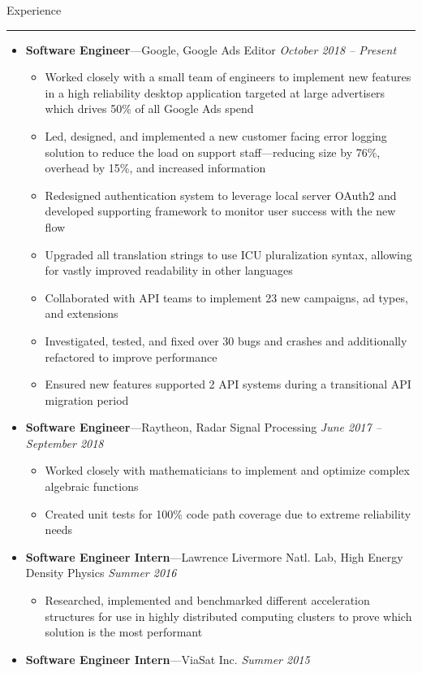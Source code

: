 \documentclass[10pt,oneside]{article}
\newcommand{\sectitle}[1]{
  \begin{flushleft}{\selectfont\Large#1}\end{flushleft}
}
\newenvironment{ressection}[1]{
  \vspace{0pt}
  \sectitle{#1}
  \vspace{-10pt}\rule{\textwidth}{0.5pt}
  \vspace{-10pt}
  \begin{itemize}[leftmargin=13pt]
  \vspace{-2pt}
}{
  \end{itemize}
}
\newcommand{\ressubitem}[1]{
  \vspace{-1pt}
  \item[--] \begin{flushleft} #1 \end{flushleft}
}
\newcommand{\resbigitemline}[3]{
  \vspace{-1pt}
  \item
  \textbf{#1}---#2
  \hfill
  \textit{#3}
}
\newenvironment{ressubsecline}[3]{
  \resbigitemline{#1}{#2}{#3}
  \vspace{-2pt}
  \begin{itemize}
}{
  \end{itemize}
  \vspace{-2pt}
}
\begin{document}
\begin{ressection}{Experience}
  \begin{ressubsecline}{Software Engineer}{Google, Google Ads Editor}{October 2018 -- Present}
    \ressubitem{Worked closely with a small team of engineers to implement new features in a high reliability desktop application targeted at large advertisers which drives 50\% of all Google Ads spend}
    \ressubitem{Led, designed, and implemented a new customer facing error logging solution to reduce the load on support staff---reducing size by 76\%, overhead by 15\%, and increased information}
    \ressubitem{Redesigned authentication system to leverage local server OAuth2 and developed supporting framework to monitor user success with the new flow}
    \ressubitem{Upgraded all translation strings to use ICU pluralization syntax, allowing for vastly improved readability in other languages}
    \ressubitem{Collaborated with API teams to implement 23 new campaigns, ad types, and extensions}
    \ressubitem{Investigated, tested, and fixed over 30 bugs and crashes and additionally refactored to improve performance}
    \ressubitem{Ensured new features supported 2 API systems during a transitional API migration period}
  \end{ressubsecline}
  \begin{ressubsecline}{Software Engineer}{Raytheon, Radar Signal Processing}{June 2017 -- September 2018}
    \ressubitem{Worked closely with mathematicians to implement and optimize complex algebraic functions}
    \ressubitem{Created unit tests for 100\% code path coverage due to extreme reliability needs}
  \end{ressubsecline}
  \begin{ressubsecline}{Software Engineer Intern}{Lawrence Livermore Natl. Lab, High Energy Density Physics}{Summer 2016}
    \ressubitem{Researched, implemented and benchmarked different acceleration structures for use in highly distributed computing clusters to prove which solution is the most performant}
  \end{ressubsecline}
  \resbigitemline{Software Engineer Intern}{ViaSat Inc.}{Summer 2015}
\end{ressection}
\end{document}
